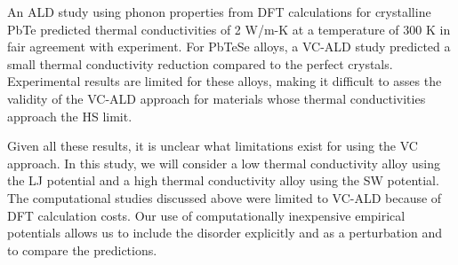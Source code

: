 \documentclass[12pt,twocolumn,iop]{/usr/share/texmf/tex/latex/iop/iopart}[/usr/share/texmf/tex/latex/iop/]
\begin{document}
An ALD study using phonon properties from DFT calculations for 
crystalline PbTe\cite{shiga_microscopic_2012} predicted 
thermal conductivities of 2 W/m-K at a temperature of 300 K 
in fair agreement with experiment. 
For PbTeSe alloys, a VC-ALD 
study predicted a small thermal conductivity reduction compared to the 
perfect crystals.\cite{tian_phonon_2012} Experimental results are limited 
for these alloys,\cite{kudman_thermoelectric_1972,pei_convergence_2011} 
making it difficult to asses the validity of the VC-ALD approach for 
materials whose thermal conductivities approach the HS limit.

Given all these results, it is unclear what limitations exist for 
using the VC approach. 
In this study, we will consider a low thermal conductivity alloy  
using the LJ potential and a high thermal conductivity alloy using the 
SW potential. The computational studies discussed above were 
limited to VC-ALD 
because of DFT calculation costs. Our use of computationally 
inexpensive empirical potentials allows us to include the disorder 
explicitly and as a perturbation and to compare the predictions. 


\end{document}
